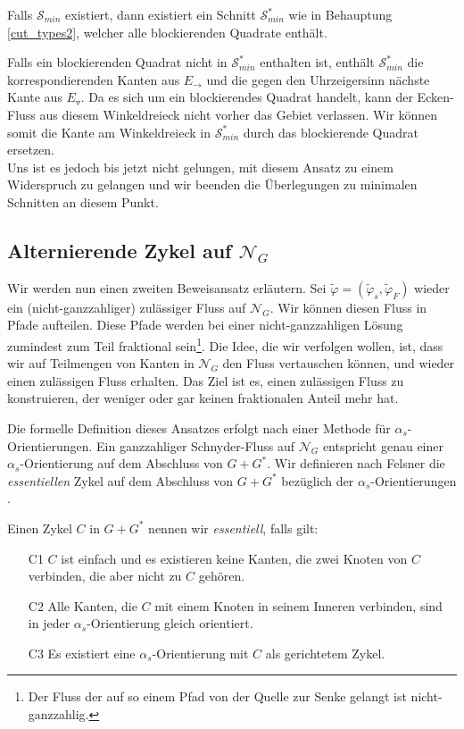 \begin{claim}
Falls $\mathcal{S}_{min}$ existiert, dann existiert ein Schnitt $\mathcal{S}^*_{min}$ wie in Behauptung \ref{cut_types2}, welcher alle blockierenden Quadrate enthält.
\end{claim}

Falls ein blockierenden Quadrat nicht in $\mathcal{S}^*_{min}$ enthalten ist, enthält $\mathcal{S}^*_{min}$ die korrespondierenden Kanten aus $E_\to$ und die gegen den Uhrzeigersinn nächste Kante aus $E_\triangledown$. Da es sich um ein blockierendes Quadrat handelt, kann der Ecken-Fluss aus diesem Winkeldreieck nicht vorher das Gebiet verlassen. Wir können somit die Kante am Winkeldreieck in $\mathcal{S}^*_{min}$ durch das blockierende Quadrat ersetzen. \\

Uns ist es jedoch bis jetzt nicht gelungen, mit diesem Ansatz zu einem Widerspruch zu gelangen und wir beenden die Überlegungen zu minimalen Schnitten an diesem Punkt.

\subsection{Alternierende Zykel auf $\mathcal{N}_G$}

Wir werden nun einen zweiten Beweisansatz erläutern. Sei $\tilde{\varphi}=(\tilde{\varphi}_s,\tilde{\varphi}_F)$ wieder ein (nicht-ganzzahliger) zulässiger Fluss auf $\mathcal{N}_G$. Wir können diesen Fluss in Pfade aufteilen. Diese Pfade werden bei einer nicht-ganzzahligen Lösung zumindest zum Teil fraktional sein\footnote{Der Fluss der auf so einem Pfad von der Quelle zur Senke gelangt ist nicht-ganzzahlig.}. Die Idee, die wir verfolgen wollen, ist, dass wir auf Teilmengen von Kanten in $\mathcal{N}_G$ den Fluss vertauschen können, und wieder einen zulässigen Fluss erhalten. Das Ziel ist es, einen zulässigen Fluss zu konstruieren, der weniger oder gar keinen fraktionalen Anteil mehr hat.

Die formelle Definition dieses Ansatzes erfolgt nach einer Methode für $\alpha_s$-Orientie\-rungen. Ein ganzzahliger Schnyder-Fluss auf $\mathcal{N}_G$ entspricht genau einer $\alpha_s$-Orientie\-rung auf dem Abschluss von $G+G^*$. Wir definieren nach Felsner die \textit{essentiellen} Zykel auf dem Abschluss von $G+G^*$ bezüglich der $\alpha_s$-Orientierungen \cite{felsner04}.

\begin{definition}
Einen Zykel $C$ in $G+G^*$ nennen wir \textit{essentiell}, falls gilt:
\begin{itemize}
\item[C1] $C$ ist einfach und es existieren keine Kanten, die zwei Knoten von $C$ verbinden, die aber nicht zu $C$ gehören.
\item[C2] Alle Kanten, die $C$ mit einem Knoten in seinem Inneren verbinden, sind in jeder $\alpha_s$-Orientierung gleich orientiert.
\item[C3] Es existiert eine $\alpha_s$-Orientierung mit $C$ als gerichtetem Zykel.
\end{itemize}
\end{definition}

